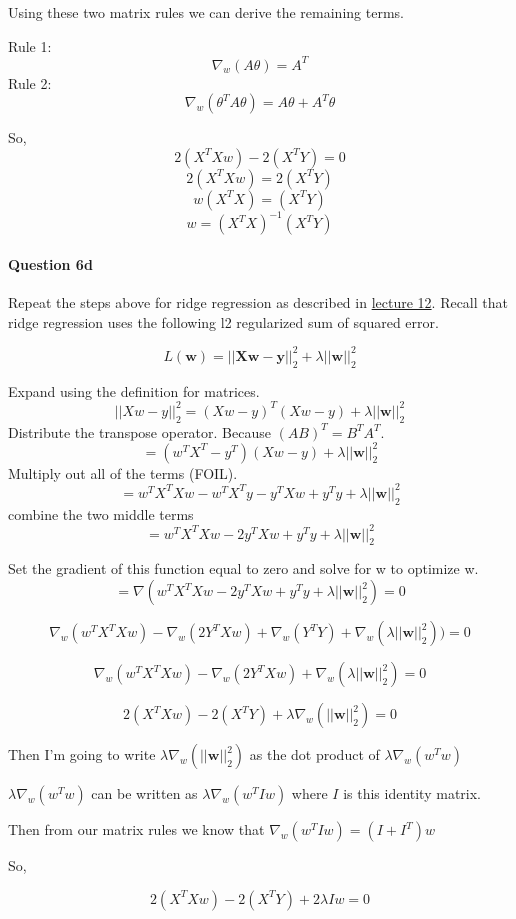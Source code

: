 \documentclass[11pt]{article}
\begin{document}
Using these two matrix rules we can derive the remaining terms.

Rule 1: \[\nabla_w (A\theta) = A^T \] Rule 2:
\[\nabla_w (\theta^TA\theta) = A\theta + A^T\theta \]

So, \[2(X^TXw) - 2(X^TY) = 0\] \[2(X^TXw) = 2(X^TY)\]
\[w(X^TX) = (X^TY)\] \[w = (X^TX)^{-1}(X^TY)\]

    \paragraph{Question 6d}\label{question-6d}

Repeat the steps above for ridge regression as described in
\href{http://www.ds100.org/fa18/syllabus\#lecture-week-6}{lecture 12}.
Recall that ridge regression uses the following l2 regularized sum of
squared error.

\[L(\textbf{w}) = ||\textbf{X}\textbf{w} - \textbf{y}||_2^2 + \lambda ||\textbf{w}||_2^2\]

    Expand using the definition for matrices.
\[||Xw - y||^2_2= (Xw - y)^T (Xw - y) + \lambda ||\textbf{w}||_2^2\]
Distribute the transpose operator. Because \((AB)^T = B^TA^T\).
\[ = (w^T X^T - y^T) (Xw - y) + \lambda ||\textbf{w}||_2^2\] Multiply
out all of the terms (FOIL).
\[ = w^T X^T X w - w^T X^T y - y^T X w + y^T y + \lambda ||\textbf{w}||_2^2\]
combine the two middle terms
\[ = w^T X^T X w - 2y^T X w + y^T y + \lambda ||\textbf{w}||_2^2\]

Set the gradient of this function equal to zero and solve for w to
optimize w.
\[ = \nabla(w^T X^T X w - 2y^T X w + y^T y + \lambda ||\textbf{w}||_2^2) = 0\]

\[\nabla_w (w^T X^T X w) - \nabla_w(2Y^T X w) + \nabla_w(Y^T Y) + \nabla_w(\lambda ||\textbf{w}||_2^2)) = 0\]

\[\nabla_w (w^T X^T X w) - \nabla_w(2Y^T X w) +  \nabla_w(\lambda ||\textbf{w}||_2^2)= 0\]

\[2(X^TXw) - 2(X^TY) +  \lambda \nabla_w( ||\textbf{w}||_2^2)= 0\]

Then I'm going to write \(\lambda \nabla_w( ||\textbf{w}||_2^2)\) as the
dot product of \(\lambda \nabla_w( w^Tw)\)

\(\lambda \nabla_w( w^Tw)\) can be written as
\(\lambda \nabla_w( w^TIw)\) where \(I\) is this identity matrix.

Then from our matrix rules we know that \(\nabla_w(w^TIw) = (I+I^T)w\)

So,

\[2(X^TXw) - 2(X^TY) +  2\lambda Iw= 0\]
\end{document}
